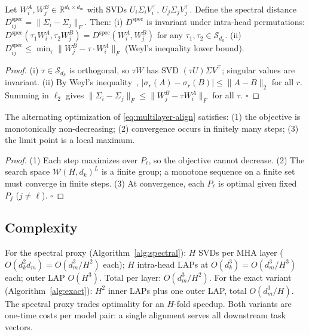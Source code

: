 \begin{theorem}\label{thm:spectral-consistency}
Let $W_i^A, W_j^B \in \mathbb{R}^{d_k \times d_m}$ with SVDs $U_i\Sigma_i V_i^\top$, $U_j\Sigma_j V_j^\top$. Define the spectral distance $D_{ij}^{\text{spec}} = \|\Sigma_i - \Sigma_j\|_F$. Then: (i) $D^{\text{spec}}$ is invariant under intra-head permutations: $D^{\text{spec}}(\tau_1 W_i^A, \tau_2 W_j^B) = D^{\text{spec}}(W_i^A, W_j^B)$ for any $\tau_1, \tau_2 \in \mathcal{S}_{d_k}$. (ii) $D_{ij}^{\text{spec}} \leq \min_{\tau} \|W_j^B - \tau \cdot W_i^A\|_F$ (Weyl's inequality lower bound).
\end{theorem}

\begin{proof}
(i) $\tau \in \mathcal{S}_{d_k}$ is orthogonal, so $\tau W$ has SVD $(\tau U)\Sigma V^\top$; singular values are invariant. (ii) By Weyl's inequality~\cite{Horn1991}, $|\sigma_r(A) - \sigma_r(B)| \leq \|A - B\|_2$ for all $r$. Summing in $\ell_2$ gives $\|\Sigma_i - \Sigma_j\|_F \leq \|W_j^B - \tau W_i^A\|_F$ for all $\tau$. \hfill $\square$
\end{proof}

\begin{theorem}\label{thm:convergence}
The alternating optimization of \eqref{eq:multilayer-align} satisfies: (1) the objective is monotonically non-decreasing; (2) convergence occurs in finitely many steps; (3) the limit point is a local maximum.
\end{theorem}

\begin{proof}
(1) Each step maximizes over $P_\ell$, so the objective cannot decrease. (2) The search space $\mathcal{W}(H, d_k)^L$ is a finite group; a monotone sequence on a finite set must converge in finite steps. (3) At convergence, each $P_\ell$ is optimal given fixed $P_j$ ($j \neq \ell$). \hfill $\square$
\end{proof}

\subsection{Complexity}

For the spectral proxy (Algorithm~\ref{alg:spectral}): $H$ SVDs per MHA layer ($O(d_k^2 d_m) = O(d_m^3/H^2)$ each); $H$ intra-head LAPs at $O(d_k^3) = O(d_m^3/H^3)$ each; outer LAP $O(H^3)$. Total per layer: $O(d_m^3/H^2)$. For the exact variant (Algorithm~\ref{alg:exact}): $H^2$ inner LAPs plus one outer LAP, total $O(d_m^3/H)$. The spectral proxy trades optimality for an $H$-fold speedup. Both variants are one-time costs per model pair: a single alignment serves all downstream task vectors.
